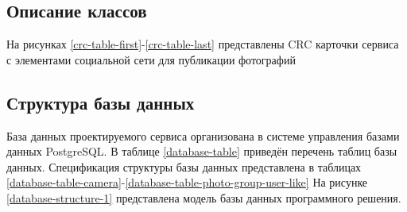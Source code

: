 \begin{landscape}
\end{landscape}


\subsection{Описание классов}
На рисунках \ref{crc-table-first}-\ref{crc-table-last} представлены CRC карточки сервиса с элементами социальной сети для публикации фотографий


\subsection{Структура базы данных}
База данных проектируемого сервиса организована в системе управления базами данных PostgreSQL. 
В таблице \ref{database-table} приведён перечень таблиц базы данных. 
Спецификация структуры базы данных представлена в таблицах \ref{database-table-camera}-\ref{database-table-photo-group-user-like}
На рисунке \ref{database-structure-1} представлена модель базы данных программного решения.

